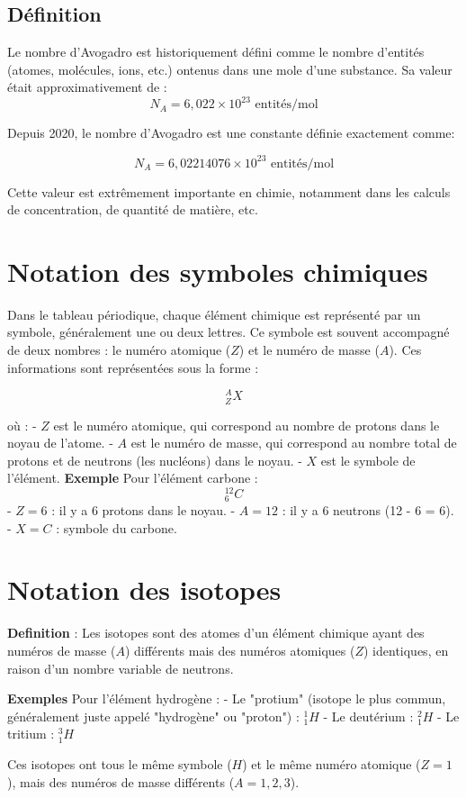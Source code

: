 \documentclass{article}
\begin{document}
\subsection{Définition}

Le nombre d'Avogadro est historiquement défini comme le nombre d'entités (atomes, molécules, ions, etc.) 
ontenus dans une mole d'une substance. Sa valeur était approximativement de :
\[
N_A = 6,022 \times 10^{23} \text{ entités/mol}
\]

Depuis 2020, le nombre d'Avogadro est une constante définie exactement comme:

\[
N_A = 6,022 140 76 \times 10^{23} \text{ entités/mol}
\]

Cette valeur est extrêmement importante en chimie, notamment dans les calculs de concentration,
de quantité de matière, etc.

\section{Notation des symboles chimiques}

Dans le tableau périodique, chaque élément chimique est représenté par un symbole, généralement
une ou deux lettres. Ce symbole est souvent accompagné de deux nombres : le numéro atomique 
(\(Z\)) et le numéro de masse (\(A\)). Ces informations sont représentées sous la forme :

\[
^{A}_{Z}X
\]

où :
- \(Z\) est le numéro atomique, qui correspond au nombre de protons dans le noyau de l'atome.
- \(A\) est le numéro de masse, qui correspond au nombre total de protons et de neutrons (les nucléons) dans le noyau.
- \(X\) est le symbole de l'élément.
\vfill
\textbf{Exemple}
Pour l'élément carbone :
\[
^{12}_{6}C
\]
- \(Z = 6\) : il y a 6 protons dans le noyau.
- \(A = 12\) : il y a 6 neutrons (12 - 6 = 6).
- \(X = C\) : symbole du carbone.

\section{Notation des isotopes}

\textbf{Definition} : Les isotopes sont des atomes d'un élément chimique ayant des numéros de masse (\(A\)) différents
mais des numéros atomiques (\(Z\)) identiques, en raison d'un nombre variable de neutrons.

\vfill
\textbf{Exemples}
Pour l'élément hydrogène :
- Le "protium" (isotope le plus commun, généralement juste appelé "hydrogène" ou "proton") : \({}^{1}_{1}H\)
- Le deutérium : \({}^{2}_{1}H\)
- Le tritium : \({}^{3}_{1}H\)

Ces isotopes ont tous le même symbole (\(H\)) et le même numéro atomique (\(Z = 1\)),
mais des numéros de masse différents (\(A = 1, 2, 3\)).
\end{document}
